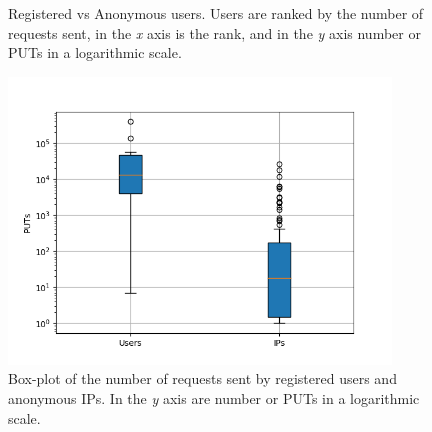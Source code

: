 \documentclass{llncs}
\begin{document}
\begin{figure}[t]
    \centering

    \caption{
        Registered vs Anonymous users.  Users are ranked by
        the number of requests sent, in the \emph{x} axis is the rank, and in the \emph{y} axis 
        number or PUTs in a logarithmic scale.    }
    \label{fig:puts}
\end{figure}

\begin{figure}[t]
    \centering
        \includegraphics[width=4in]{img/puts_box.png}
    \caption{ Box-plot of the number of requests sent by registered users and anonymous IPs.
     In the \emph{y} axis are number or PUTs in a logarithmic scale.
    }
    \label{fig:box}
\end{figure}
\end{document}
